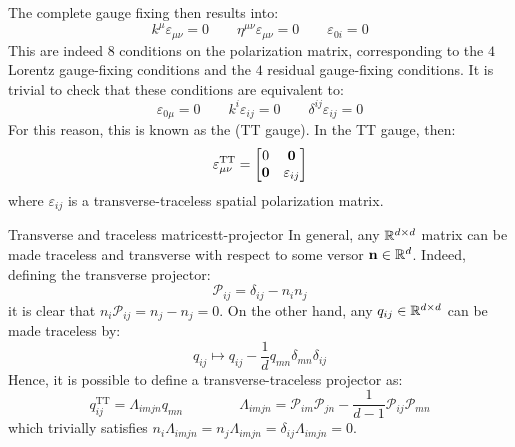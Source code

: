 The complete gauge fixing then results into:
\begin{equation*}
  k^\mu \varepsilon_{\mu \nu} = 0
  \qquad
  \eta^{\mu \nu} \varepsilon_{\mu \nu} = 0
  \qquad
  \varepsilon_{0i} = 0
\end{equation*}
This are indeed $ 8 $ conditions on the polarization matrix, corresponding to the $ 4 $ Lorentz gauge-fixing conditions and the $ 4 $ residual gauge-fixing conditions. It is trivial to check that these conditions are equivalent to:
\begin{equation}
  \varepsilon_{0\mu} = 0
  \qquad
  k^i \varepsilon_{ij} = 0
  \qquad
  \delta^{ij} \varepsilon_{ij} = 0
  \label{eq:tt-gauge}
\end{equation}
For this reason, this is known as the  (TT gauge). In the TT gauge, then:
\begin{equation*}
  \varepsilon_{\mu \nu}^\text{TT} =
  \begin{bmatrix}
    0 & \mathbf{0} \\
    \mathbf{0} & \varepsilon_{ij}
  \end{bmatrix}
\end{equation*}
where $ \varepsilon_{ij} $ is a transverse-traceless spatial polarization matrix.

\begin{observation}{Transverse and traceless matrices}{tt-projector}
  In general, any $ \mathbb{R}^{d \times d} $ matrix can be made traceless and transverse with respect to some versor $ \mathbf{n} \in \mathbb{R}^d $. Indeed, defining the transverse projector:
  \begin{equation}
    \mathcal{P}_{ij} = \delta_{ij} - n_i n_j
  \end{equation}
  it is clear that $ n_i \mathcal{P}_{ij} = n_j - n_j = 0 $. On the other hand, any $ q_{ij} \in \mathbb{R}^{d \times d} $ can be made traceless by:
  \begin{equation*}
    q_{ij} \mapsto q_{ij} - \frac{1}{d} q_{mn} \delta_{mn} \delta_{ij}
  \end{equation*}
  Hence, it is possible to define a transverse-traceless projector as:
  \begin{equation}
    q_{ij}^\text{TT} = \Lambda_{imjn} q_{mn}
    \qquad \qquad
    \Lambda_{imjn} = \mathcal{P}_{im} \mathcal{P}_{jn} - \frac{1}{d-1} \mathcal{P}_{ij} \mathcal{P}_{mn}
  \end{equation}
  which trivially satisfies $ n_i \Lambda_{imjn} = n_j \Lambda_{imjn} = \delta_{ij} \Lambda_{imjn} = 0 $.
\end{observation}

